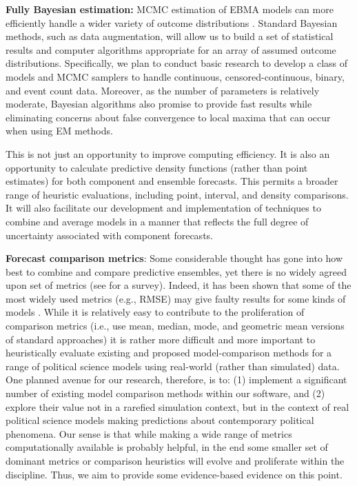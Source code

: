 \documentclass[pdftex,12pt,fullpage,oneside]{amsart}
\begin{document}
\textbf{Fully Bayesian estimation:} MCMC estimation of EBMA models can
more efficiently handle a wider variety of outcome distributions
\citep{Vrugt:2008}.  Standard Bayesian methods, such as data
augmentation, will allow us to build a set of statistical results and
computer algorithms appropriate for an array of assumed outcome
distributions.  Specifically, we plan to conduct basic research to
develop a class of models and MCMC samplers to handle continuous,
censored-continuous, binary, and event count data. Moreover, as the
number of parameters is relatively moderate, Bayesian algorithms also
promise to provide fast results while eliminating concerns about false
convergence to local maxima that can occur when using EM methods.
  
This is not just an opportunity to improve computing efficiency.  It
is also an opportunity to calculate predictive density functions
(rather than point estimates) for both component and ensemble
forecasts. This permits a broader range of heuristic evaluations,
including point, interval, and density comparisons.  It will also
facilitate our development and implementation of techniques to combine
and average models in a manner that reflects the full degree of
uncertainty associated with component forecasts.
  
\textbf{Forecast comparison metrics}: Some considerable thought has
gone into how best to combine and compare predictive ensembles, yet
there is no widely agreed upon set of metrics (see
\citet{brandt:freeman:schrodt:2011} for a survey). Indeed, it has been
shown that some of the most widely used metrics (e.g., RMSE) may give
faulty results for some kinds of models
\citep{geweke:amisano:2011}. While it is relatively easy to contribute
to the proliferation of comparison metrics (i.e., use mean, median,
mode, and geometric mean versions of standard approaches) it is rather
more difficult and more important to heuristically evaluate existing
and proposed model-comparison methods for a range of political science
models using real-world (rather than simulated) data. One planned
avenue for our research, therefore, is to: (1) implement a significant
number of existing model comparison methods within our software, and
(2) explore their value not in a rarefied simulation context, but in
the context of real political science models making predictions about
contemporary political phenomena. Our sense is that while making a
wide range of metrics computationally available is probably helpful,
in the end some smaller set of dominant metrics or comparison
heuristics will evolve and proliferate within the discipline. Thus, we
aim to provide some evidence-based evidence on this point.
\end{document}
